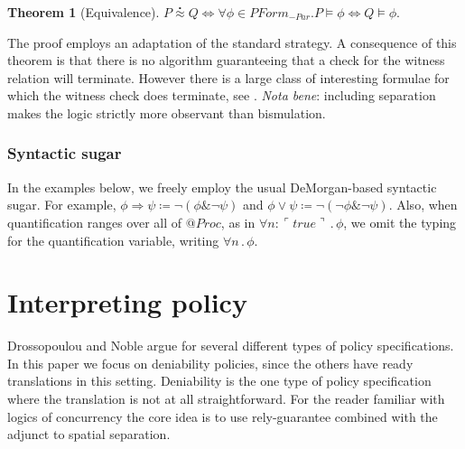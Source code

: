 \documentclass[]{acm_proc_article-sp}
\makeatletter
\newcommand{\lpquote}{\ulcorner}
\newcommand{\rpquote}{\urcorner}
\newcommand{\quotep}[1]{@#1}
\newcommand{\QProc}{\quotep{\mathbin{Proc}}}
\newcommand{\defneqls}{\coloneqq}
\newcommand{\wbbisim}{\stackrel{\centerdot}{\approx}} %
\newcommand{\ptrue}{\mathbin{true}}
\newcommand{\pquotep}[1]{\lpquote #1 \rpquote}
\newcommand{\pquant}[3]{\forall #1 \mathbin{:} #2 \mathbin{.} #3}
\newcommand{\pquantuntyped}[2]{\forall #1 \mathbin{.} #2}
\newcommand{\riff}{\Leftrightarrow}
\newcommand{\PFormula}{\mathbin{PForm}}
\newtheorem{thm}{Theorem}[subsection]
\numberwithin{equation}{subsection}
\makeatother
\begin{document}
\begin{thm}[Equivalence]\label{sec:equivalence_theorem}
	$P \wbbisim Q \riff \forall \phi \in \PFormula_{-Par} . P \models \phi \riff Q \models \phi .$
\end{thm}

The proof employs an adaptation of the standard strategy. A
consequence of this theorem is that there is no algorithm guaranteeing
that a check for the witness relation will terminate. However there is
a large class of interesting formulae for which the witness check does
terminate, see \cite{DBLP:conf/fossacs/Caires04}. {\em Nota bene}: including
separation makes the logic strictly more observant than bismulation.

\subsubsection{Syntactic sugar }

In the examples below, we freely employ the usual DeMorgan-based
syntactic sugar. For example, $\phi \Rightarrow \psi \defneqls \neg (
\phi \& \neg \psi )$ and $\phi \vee \psi \defneqls \neg ( \neg \phi \&
\neg \psi )$. Also, when quantification ranges over all of $\QProc$,
as in $\pquant{n}{\pquotep{\ptrue}}{\phi}$, we omit the typing for the
quantification variable, writing $\pquantuntyped{n}{\phi}$.

\section{Interpreting policy}

Drossopoulou and Noble \cite{Drossopoulou:2013:NCP:2489804.2489811} argue for
several different types of policy specifications. In this paper we
focus on deniability policies, since the others have ready
translations in this setting. Deniability is the one type of policy
specification where the translation is not at all straightforward. For
the reader familiar with logics of concurrency the core idea is to use
rely-guarantee combined with the adjunct to spatial separation.
\end{document}
